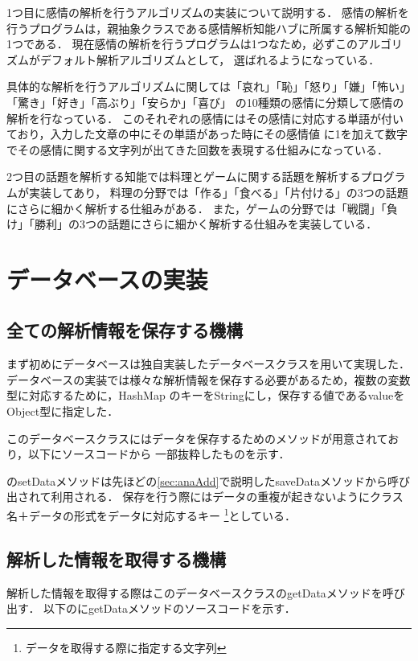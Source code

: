1つ目に感情の解析を行うアルゴリズムの実装について説明する．
感情の解析を行うプログラムは，親抽象クラスである感情解析知能ハブに所属する解析知能の1つである．
現在感情の解析を行うプログラムは1つなため，必ずこのアルゴリズムがデフォルト解析アルゴリズムとして，
選ばれるようになっている．

具体的な解析を行うアルゴリズムに関しては「哀れ」「恥」「怒り」「嫌」「怖い」「驚き」「好き」「高ぶり」「安らか」「喜び」
の10種類の感情に分類して感情の解析を行なっている．
このそれぞれの感情にはその感情に対応する単語が付いており，入力した文章の中にその単語があった時にその感情値
に1を加えて数字でその感情に関する文字列が出てきた回数を表現する仕組みになっている．

2つ目の話題を解析する知能では料理とゲームに関する話題を解析するプログラムが実装してあり，
料理の分野では「作る」「食べる」「片付ける」の3つの話題にさらに細かく解析する仕組みがある．
また，ゲームの分野では「戦闘」「負け」「勝利」の3つの話題にさらに細かく解析する仕組みを実装している．


\section{データベースの実装}
\subsection{全ての解析情報を保存する機構}
まず初めにデータベースは独自実装したデータベースクラスを用いて実現した．
データベースの実装では様々な解析情報を保存する必要があるため，複数の変数型に対応するために，HashMap
のキーをStringにし，保存する値であるvalueをObject型に指定した．

このデータベースクラスにはデータを保存するためのメソッドが用意されており，以下にソースコードから
一部抜粋したものを示す．


のsetDataメソッドは先ほどの\ref{sec:anaAdd}で説明したsaveDataメソッドから呼び出されて利用される．
保存を行う際にはデータの重複が起きないようにクラス名＋データの形式をデータに対応するキー
\footnote{データを取得する際に指定する文字列}としている．

\subsection{解析した情報を取得する機構}
解析した情報を取得する際はこのデータベースクラスのgetDataメソッドを呼び出す．
以下のにgetDataメソッドのソースコードを示す．

